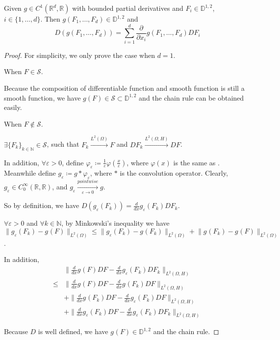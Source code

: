 \begin{theorem}
Given $g \in C^{1}(\mathbb{R}^d, \mathbb{R})$ 
with bounded partial derivatives
and $F_i \in \mathbb{D}^{1, 2}$, $i \in \{1, \dots, d\}$. 
Then $g(F_1, \dots, F_d) \in \mathbb{D}^{1, 2}$ 
and 
\[D(g(F_1, \dots, F_d))
= \sum_{i=1}^{d} \frac{\partial}{\partial x_i}g(F_1, \dots, F_d) DF_i\]
\end{theorem}
\setcounter{stepCounter}{1}
\begin{proof}
For simplicity, we only prove the case when $d= 1$. 

\step{} When $F \in \mathcal{S}$. 

Because the composition of differentiable function and smooth function is still a smooth function, 
we have $g(F) \in \mathcal{S} \subset \mathbb{D}^{1, 2}$ and the chain rule can be obtained easily. 

\step{} When $F \notin \mathcal{S}$. 

$\exists \{F_k\}_{k \in \mathbb{N}} \in \mathcal{S}$, 
such that $F_k \xrightarrow{L^2(\Omega)} F$ 
and $DF_k \xrightarrow{L^2(\Omega, H)} DF$. 

In addition, $\forall \varepsilon > 0$, 
define $\varphi_{\varepsilon} \coloneqq \frac{1}{\varepsilon}\varphi(\frac{x}{\varepsilon})$, 
where $\varphi(x)$ is the same as 
. 
Meanwhile define $g_{\varepsilon} \coloneqq g \ast \varphi_{\varepsilon}$,
where $\ast$ is the convolution operator. 
Clearly, $g_{\varepsilon} \in C_{0}^{\infty} (\mathbb{R}, \mathbb{R})$, 
and $g_{\varepsilon} \xrightarrow[\varepsilon \to 0]{pointwise} g$.

So by definition, we have 
$D(g_{\varepsilon}(F_k)) = \frac{d}{dx} g_{\varepsilon}(F_k) DF_k$. 

$\forall \varepsilon > 0$ and $\forall k \in \mathbb{N}$, 
by Minkowski's inequality
we have $\lVert g_{\varepsilon}(F_k) - g_{}(F) \rVert_{L^2(\Omega)}
\leq \lVert g_{\varepsilon}(F_k) - g_{}(F_k) \rVert_{L^2(\Omega)}
+ \lVert g_{}(F_k) - g_{}(F) \rVert_{L^2(\Omega)}$. 

In addition, 
\begin{equation*}
\begin{aligned}
&\lVert \frac{d}{dx}g_{}(F)DF - \frac{d}{dx} g_{\varepsilon}(F_k)DF_k \rVert_{L^2(\Omega, H)} \\
\leq &\lVert \frac{d}{dx}g_{}(F)DF - \frac{d}{dx} g_{}(F_k)DF \rVert_{L^2(\Omega, H)}\\
&+ \lVert \frac{d}{dx} g_{}(F_k)DF - \frac{d}{dx} g_{\varepsilon}(F_k)DF \rVert_{L^2(\Omega, H)} \\
&+ \lVert \frac{d}{dx} g_{\varepsilon}(F_k)DF - \frac{d}{dx} g_{\varepsilon}(F_k)DF_k  \rVert_{L^2(\Omega, H)}
\end{aligned}
\end{equation*}

Because $D$ is well defined, we have $g_{}(F) \in \mathbb{D}^{1, 2}$ and the chain rule. 

\end{proof}

